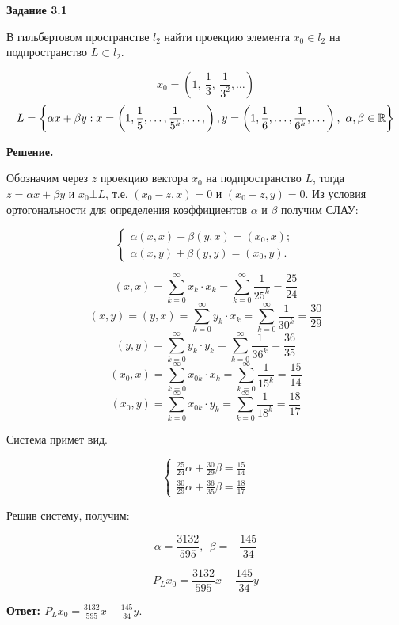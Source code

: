 \documentclass[12pt, a4paper]{article}
\begin{document}
\pagebreak

\textbf{Задание 3.1} 

В гильбертовом пространстве $l_2$ найти проекцию элемента $x_0 \in l_2$ на
подпространство $L \subset l_2$.

\[x_0 = \left( 1,\ \frac{1}{3},\ \frac{1}{3^2},\dots \right)\]
\[
L = \left\{ \alpha x + \beta y: x = \left( 1, \frac{1}{5},\dots,\frac{1}{5^k},\dots, \right),
\\y = \left( 1, \frac{1}{6}, \dots, \frac{1}{6^k}, \dots \right),\ \alpha, \beta \in \mathbb{R}  \right\}  \]

\textbf{Решение.}

Обозначим через $z$ проекцию вектора $x_0$ на подпространство $L$, тогда 
$z=\alpha x + \beta y$ и $x_0 \bot L$, т.е. $(x_0 - z, x) = 0$ и $(x_0 - z, y)=0$.
Из условия ортогональности для определения коэффициентов $\alpha$ и $\beta$ 
получим СЛАУ:

\[
\begin{cases}
  \alpha (x, x) + \beta (y, x) = (x_0, x);\\
  \alpha (x, y) + \beta (y, y) = (x_0, y).
\end{cases}
\]

\[ (x, x) = \sum_{k=0}^\infty x_k  \cdot x_k = \sum_{k=0}^\infty \frac{1}{25^k} = \frac{25}{24} \]
\[ (x, y) = (y, x) = \sum_{k=0}^\infty y_k  \cdot x_k = \sum_{k=0}^\infty \frac{1}{30^k} = \frac{30}{29} \]
\[ (y, y) = \sum_{k=0}^\infty y_k  \cdot y_k = \sum_{k=0}^\infty \frac{1}{36^k} = \frac{36}{35} \]
\[ (x_0, x) = \sum_{k=0}^\infty x_{0k}  \cdot x_k = \sum_{k=0}^\infty \frac{1}{15^k} = \frac{15}{14} \]
\[ (x_0, y) = \sum_{k=0}^\infty x_{0k}  \cdot y_k = \sum_{k=0}^\infty \frac{1}{18^k} = \frac{18}{17} \]

Система примет вид.

\[
\begin{cases}
  \frac{25}{24}\alpha + \frac{30}{29}\beta = \frac{15}{14}\\
  \frac{30}{29}\alpha + \frac{36}{35}\beta = \frac{18}{17}
\end{cases}  
\]

Решив систему, получим:

\[\alpha = \frac{3132}{595},\ \ \beta=-\frac{145}{34}\]

\[P_L x_0 = \frac{3132}{595} x -\frac{145}{34} y\]

\textbf{Ответ: $P_L x_0 = \frac{3132}{595} x -\frac{145}{34} y$}.
\end{document}
